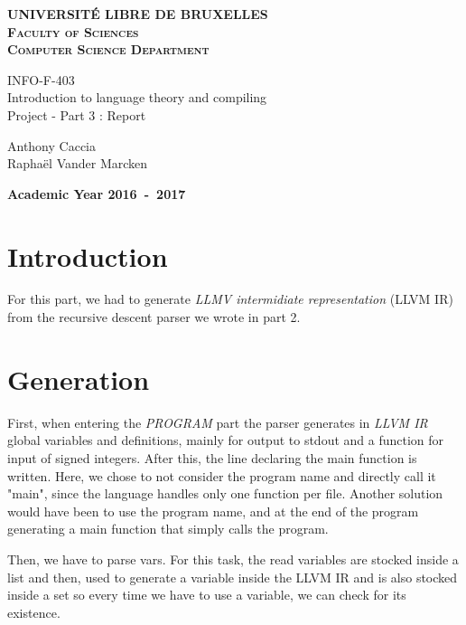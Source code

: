 \documentclass{article}
\newcommand{\hmwkClass}{INFO-F-403} %
\begin{document}
\begin{titlepage}
\begin{center}
\textbf{\textsc{UNIVERSIT\'E LIBRE DE BRUXELLES}}\\
\textbf{\textsc{Faculty of Sciences}}\\
\textbf{\textsc{Computer Science Department}}
\vfill{}
\begin{center}{\Huge \hmwkClass\\ \LARGE Introduction to language theory and compiling\\Project - Part 3 : Report}\end{center}{\Huge \par}
\begin{center}{\Large Anthony Caccia\\Raphaël Vander Marcken}\end{center}{\Huge \par}
\vfill{}
\vfill{}
\textbf{Academic Year 2016~-~2017}
\end{center}
\end{titlepage}

\section{Introduction}
For this part, we had to generate \emph{LLMV intermidiate representation} (LLVM IR) from the recursive descent parser we wrote in part 2.

\section{Generation}

First, when entering the \emph{PROGRAM} part the parser generates in \emph{LLVM IR} global variables and definitions, mainly for output to stdout and a function for input of signed integers. After this, the line declaring the main function is written. Here, we chose to not consider the program name and directly call it "main", since the language handles only one function per file. Another solution would have been to use the program name, and at the end of the program generating a main function that simply calls the program.

Then, we have to parse vars. For this task, the read variables are stocked inside a list and then, used to generate a variable inside the LLVM IR and is also stocked inside a set so every time we have to use a variable, we can check for its existence.
\end{document}
